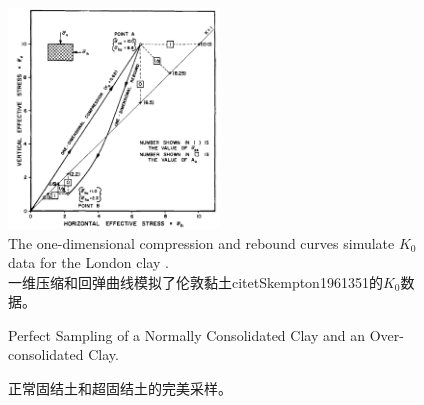 \begin{figure}[!htb]
    \centering
    \includegraphics[width=0.5\textwidth]{figures/figure-1.png}\\
    The one-dimensional compression and rebound curves simulate $K_0$ data for the London clay \citet{Skempton1961351}. \\
    一维压缩和回弹曲线模拟了伦敦黏土citet{Skempton1961351}的$K_0$数据。
    \caption{Perfect Sampling of a Normally Consolidated Clay and an Over-consolidated Clay.}
    \addtocounter{figure}{-1}
    \vspace{-5pt}
    \renewcommand{\figurename}{图}
    \caption{正常固结土和超固结土的完美采样。}
    \renewcommand{\figurename}{Figure}
    \label{figure:1}
\end{figure}